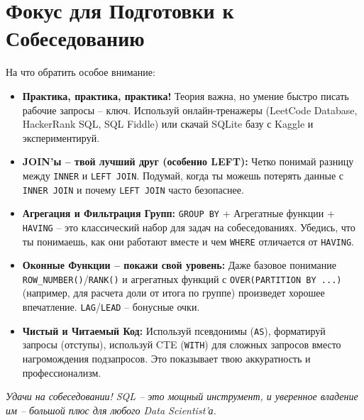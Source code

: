 \section*{Фокус для Подготовки к Собеседованию}
\begin{alerttextbox}{На что обратить особое внимание:}
    \begin{itemize}
        \item \textbf{Практика, практика, практика!} Теория важна, но умение быстро писать рабочие запросы – ключ. Используй онлайн-тренажеры (LeetCode Database, HackerRank SQL, SQL Fiddle) или скачай SQLite базу с Kaggle и экспериментируй.
        \item \textbf{JOIN'ы – твой лучший друг (особенно LEFT):} Четко понимай разницу между \texttt{INNER} и \texttt{LEFT JOIN}. Подумай, когда ты можешь потерять данные с \texttt{INNER JOIN} и почему \texttt{LEFT JOIN} часто безопаснее.
        \item \textbf{Агрегация и Фильтрация Групп:} \texttt{GROUP BY} + Агрегатные функции + \texttt{HAVING} – это классический набор для задач на собеседованиях. Убедись, что ты понимаешь, как они работают вместе и чем \texttt{WHERE} отличается от \texttt{HAVING}.
        \item \textbf{Оконные Функции – покажи свой уровень:} Даже базовое понимание \texttt{ROW\_NUMBER()}/\texttt{RANK()} и агрегатных функций с \texttt{OVER(PARTITION BY ...)} (например, для расчета доли от итога по группе) произведет хорошее впечатление. \texttt{LAG}/\texttt{LEAD} – бонусные очки.
        \item \textbf{Чистый и Читаемый Код:} Используй псевдонимы (\texttt{AS}), форматируй запросы (отступы), используй CTE (\texttt{WITH}) для сложных запросов вместо нагромождения подзапросов. Это показывает твою аккуратность и профессионализм.
    \end{itemize}
    \textit{Удачи на собеседовании! SQL – это мощный инструмент, и уверенное владение им – большой плюс для любого Data Scientist'а.}
\end{alerttextbox}

